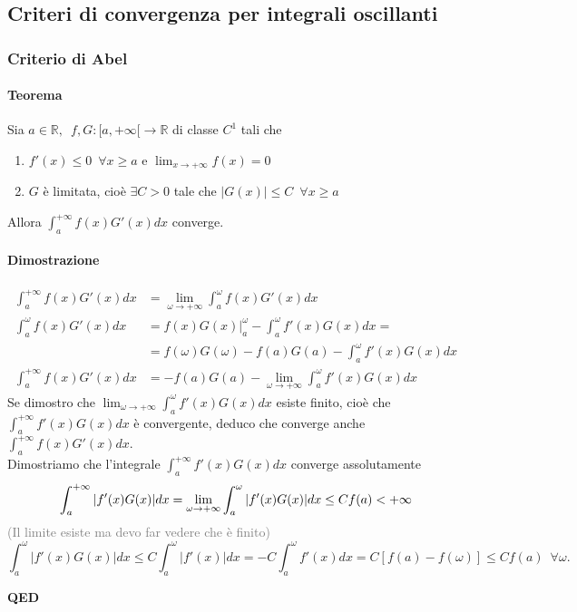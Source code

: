 \documentclass{article}
\newcommand{\R}{\mathbb{R}}
\begin{document}
\subsection{{Criteri di convergenza per integrali oscillanti}}
\subsubsection{Criterio di Abel}
\paragraph{Teorema}
Sia $a\in\R,\,\,\,f,G:[a,+\infty[\rightarrow\R$ di classe $C^1$ tali che
\begin{enumerate}
    \item $f'(x)\leq 0 \,\,\, \forall x \geq a$ e $\lim_{x \rightarrow +\infty} f(x)=0$
    \item $G$ è limitata, cioè $\exists C > 0 $ tale che $ |G(x)|\leq C \,\,\, \forall x \geq a$
\end{enumerate}
Allora $\int_{a}^{+\infty}f(x)G'(x)dx$ converge.

\paragraph{{Dimostrazione}}
\begin{align*}
    \int_{a}^{+\infty}f(x)G'(x)dx&=\lim_{\omega \rightarrow+\infty}\int_{a}^{\omega}f(x)G'(x)dx \\
    \int_{a}^{\omega}f(x)G'(x)dx&= f(x)G(x)|_{a}^{\omega}-\int_{a}^{\omega}f'(x)G(x)dx=\\
    &=f(\omega)G(\omega)-f(a)G(a)-\int_{a}^{\omega}f'(x)G(x)dx\\
    \int_{a}^{+\infty}f(x)G'(x)dx&=-f(a)G(a)-\lim_{\omega \rightarrow +\infty}\int_{a}^{\omega}f'(x)G(x)dx
\end{align*}
Se dimostro che $\lim_{\omega \rightarrow +\infty} \int_{a}^{\omega}f'(x)G(x)dx$ esiste finito, cioè che $\int_{a}^{+\infty}f'(x)G(x)dx$ è convergente, deduco che converge anche $\int_{a}^{+\infty}f(x)G'(x)dx$.\\
Dimostriamo che l'integrale $\int_{a}^{+\infty}f'(x)G(x)dx$ converge assolutamente
\begin{equation*}
    \int_{a}^{+\infty}|f'(x)G(x)|dx= \lim_{\omega \rightarrow +\infty}\int_{a}^{\omega} |f'(x)G(x)|dx\leq Cf(a)< +\infty\\
\end{equation*}
\textcolor{grey}{(Il limite esiste ma devo far vedere che è finito)}
\begin{equation*}
    \int_{a}^{\omega}|f'(x)G(x)|dx\leq C\int_{a}^{\omega}|f'(x)|dx= -C\int_{a}^{\omega}f'(x)dx=C[f(a)-f(\omega)]\leq Cf(a)\,\,\, \forall \omega.
\end{equation*}
\begin{flushright}
\textbf{QED}
\end{flushright}
\end{document}
